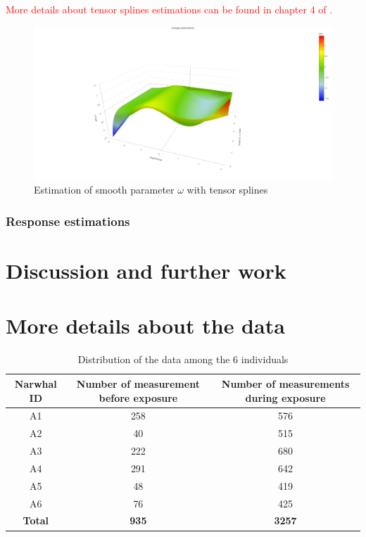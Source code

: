 \documentclass[11pt]{article}
\newcommand {\1}{\mathbb{1}}
\begin{document}
\textcolor{red}{More details about tensor splines estimations can be found in chapter 4 of \cite{wood_generalized_2017}.}

\begin{figure}[H]
	\centering
	\includegraphics[width=0.7\linewidth]{images/constrained_models/omega_estimations}
	\caption{Estimation of smooth parameter $\omega$ with tensor splines}
	\label{fig:omegaestimations}
\end{figure}



\subsubsection{Response estimations}



\section{Discussion and further work}

\newpage

\printbibliography

\newpage 

\appendix

\section{More details about the data}


\begin{table}[H]
	\centering
	\begin{tabular}{|c|c|c|}
		\hline
		Narwhal ID & Number of measurement before exposure & Number of measurements during exposure \\
		\hline
		A1 & 258 & 576\\
		\hline
		A2  & 40 & 515 \\
		\hline
		A3 & 222 & 680 \\
		\hline
		A4 & 291 & 642  \\
		\hline
		A5 & 48 & 419\\
		\hline
		A6 & 76 & 425 \\
		\hline
		\textbf{Total} & \textbf{935} & \textbf{3257} \\
		\hline
	\end{tabular}
	\caption{Distribution of the data among the 6 individuals}
	\label{table: data distribution}
\end{table}
\end{document}
